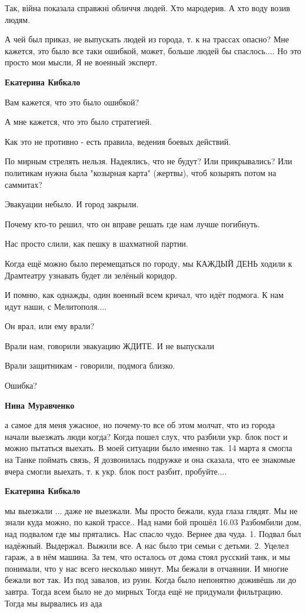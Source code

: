 
Так, війна показала справжні обличчя людей. Хто мародерив. А хто воду возив людям.


А чей был приказ, не выпускать людей из города, т. к на трассах опасно? Мне
кажется, это было все таки ошибкой, может, больше людей бы спаслось.... Но это
просто мои мысли, Я не военный эксперт.

\begin{itemize} %
\textbf{Екатерина Кибкало}

Вам кажется, что это было ошибкой?

А мне кажется, что это было стратегией.

Как это не противно - есть правила, ведения боевых действий.

По мирным стрелять нельзя. Надеялись, что не будут? Или прикрывались? Или
политикам нужна была "козырная карта" (жертвы), чтоб козырять потом на
саммитах?

Эвакуации небыло. И город закрыли.

Почему кто-то решил, что он вправе решать где нам лучше погибнуть.

Нас просто слили, как пешку в шахматной партии.

Когда ещё можно было перемещаться по городу, мы КАЖДЫЙ ДЕНЬ ходили к Драмтеатру
узнавать будет ли зелёный коридор.

И помню, как однажды, один военный всем кричал, что идёт подмога. К нам идут
наши, с Мелитополя....

Он врал, или ему врали?

Врали нам, говорили эвакуацию ЖДИТЕ. И не выпускали

Врали защитникам - говорили, подмога близко.

Ошибка?

\textbf{Нина Муравченко} 

а самое для меня ужасное, но почему-то все об этом молчат, что из города начали
выезжать люди когда? Когда пошел слух, что разбили укр. блок пост и можно
пытаться выехать. В моей ситуации было именно так. 14 марта я смогла на Танке
поймать связь, Я дозвонилась подружке и она сказала, что ее знакомые вчера смогли
выехать, т. к укр. блок пост разбит, пробуйте....

\textbf{Екатерина Кибкало} 

\obeycr
мы выезжали ... даже не выезжали.
Мы просто бежали, куда глаза глядят.
Мы не знали куда можно, по какой трассе..
Над нами бой прошёл 16.03
Разбомбили дом, над подвалом где мы прятались.
Нас спасло чудо.
Вернее два чуда.
1. Подвал был надёжный. Выдержал. Выжили все. А нас было три семьи с детьми.
2. Уцелел гараж, а в нём машина.
За тем, что осталось от дома стоял русский танк, и мы понимали, что у нас всего несколько минут.
Мы бежали в отчаянии.
И многие бежали вот так.
Из под завалов, из руин. Когда было непонятно доживёшь ли до завтра.
Тогда всем было не до мирных
Тогда ещё не придумали фильтрацию.
Тогда мы вырвались из ада
\restorecr


\end{itemize}
